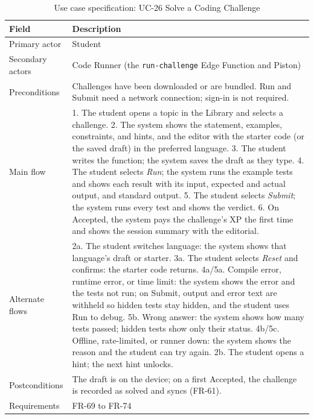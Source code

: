\documentclass[12pt,letterpaper]{article}
\begin{document}
\begin{table}[H]
\centering
\caption{Use case specification: UC-26 Solve a Coding Challenge}
\label{tab:uc26}
\begin{tabularx}{\textwidth}{@{}L{3.0cm} Y@{}}
\toprule
\textbf{Field} & \textbf{Description} \\
\midrule
Primary actor & Student \\
Secondary actors & Code Runner (the \texttt{run-challenge} Edge Function and Piston) \\
Preconditions & Challenges have been downloaded or are bundled. Run and Submit need a network connection; sign-in is not required. \\
Main flow & 1. The student opens a topic in the Library and selects a challenge. 2. The system shows the statement, examples, constraints, and hints, and the editor with the starter code (or the saved draft) in the preferred language. 3. The student writes the function; the system saves the draft as they type. 4. The student selects \emph{Run}; the system runs the example tests and shows each result with its input, expected and actual output, and standard output. 5. The student selects \emph{Submit}; the system runs every test and shows the verdict. 6. On Accepted, the system pays the challenge's XP the first time and shows the session summary with the editorial. \\
Alternate flows & 2a. The student switches language: the system shows that language's draft or starter. 3a. The student selects \emph{Reset} and confirms: the starter code returns. 4a/5a. Compile error, runtime error, or time limit: the system shows the error and the tests not run; on Submit, output and error text are withheld so hidden tests stay hidden, and the student uses Run to debug. 5b. Wrong answer: the system shows how many tests passed; hidden tests show only their status. 4b/5c. Offline, rate-limited, or runner down: the system shows the reason and the student can try again. 2b. The student opens a hint; the next hint unlocks. \\
Postconditions & The draft is on the device; on a first Accepted, the challenge is recorded as solved and syncs (FR-61). \\
Requirements & FR-69 to FR-74 \\
\bottomrule
\end{tabularx}
\end{table}
\end{document}
